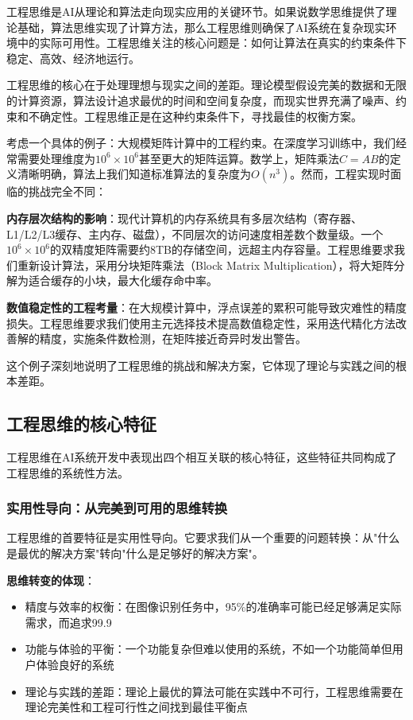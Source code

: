工程思维是AI从理论和算法走向现实应用的关键环节。如果说数学思维提供了理论基础，算法思维实现了计算方法，那么工程思维则确保了AI系统在复杂现实环境中的实际可用性。工程思维关注的核心问题是：如何让算法在真实的约束条件下稳定、高效、经济地运行。

工程思维的核心在于处理理想与现实之间的差距。理论模型假设完美的数据和无限的计算资源，算法设计追求最优的时间和空间复杂度，而现实世界充满了噪声、约束和不确定性。工程思维正是在这种约束条件下，寻找最佳的权衡方案。

考虑一个具体的例子：大规模矩阵计算中的工程约束。在深度学习训练中，我们经常需要处理维度为$10^6 \times 10^6$甚至更大的矩阵运算。数学上，矩阵乘法$C = AB$的定义清晰明确，算法上我们知道标准算法的复杂度为$O(n^3)$。然而，工程实现时面临的挑战完全不同：

\textbf{内存层次结构的影响}：现代计算机的内存系统具有多层次结构（寄存器、L1/L2/L3缓存、主内存、磁盘），不同层次的访问速度相差数个数量级。一个$10^6 \times 10^6$的双精度矩阵需要约8TB的存储空间，远超主内存容量。工程思维要求我们重新设计算法，采用分块矩阵乘法（Block Matrix Multiplication），将大矩阵分解为适合缓存的小块，最大化缓存命中率。

\textbf{数值稳定性的工程考量}：在大规模计算中，浮点误差的累积可能导致灾难性的精度损失。工程思维要求我们使用主元选择技术提高数值稳定性，采用迭代精化方法改善解的精度，实施条件数检测，在矩阵接近奇异时发出警告。

这个例子深刻地说明了工程思维的挑战和解决方案，它体现了理论与实践之间的根本差距。

\subsection{工程思维的核心特征}

工程思维在AI系统开发中表现出四个相互关联的核心特征，这些特征共同构成了工程思维的系统性方法。

\subsubsection{实用性导向：从完美到可用的思维转换}

工程思维的首要特征是实用性导向。它要求我们从一个重要的问题转换：从"什么是最优的解决方案"转向"什么是足够好的解决方案"。

\textbf{思维转变的体现}：
\begin{itemize}
\item 精度与效率的权衡：在图像识别任务中，95\%的准确率可能已经足够满足实际需求，而追求99.9%
\item 功能与体验的平衡：一个功能复杂但难以使用的系统，不如一个功能简单但用户体验良好的系统
\item 理论与实践的差距：理论上最优的算法可能在实践中不可行，工程思维需要在理论完美性和工程可行性之间找到最佳平衡点
\end{itemize}

